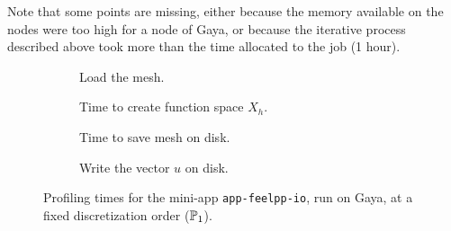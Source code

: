 Note that some points are missing, either because the memory available on the nodes were too high for a node of Gaya, or because the iterative process described above took more than the time allocated to the job (1 hour).



\begin{figure}
  \begin{subfigure}[c]{0.49\textwidth}
    \centering
    \plot{\dataLoadMesh}
    \caption{ Load the mesh. }
    \label{fig:specs:app-feelpp-io:loadmesh}
  \end{subfigure}
  \begin{subfigure}[c]{0.49\textwidth}
    \centering
    \plot{\dataFunctionSpace}
    \caption{ Time to create function space $X_h$. }
    \label{fig:specs:app-feelpp-io:functionspace}
  \end{subfigure}
  \begin{subfigure}[c]{0.49\textwidth}
    \centering
    \plot[(0.99,0.35)]{\dataSaveMesh}
    \caption{ Time to save mesh on disk. }
    \label{fig:specs:app-feelpp-io:savemesh}
  \end{subfigure}
  \begin{subfigure}[c]{0.49\textwidth}
    \centering
    \plot[(0.99,0.35)]{\dataExportData}
    \caption{ Write  the vector $u$ on disk. }
    \label{fig:specs:app-feelpp-io:export}
  \end{subfigure}
  \caption{Profiling times for the mini-app \texttt{app-feelpp-io}, run on Gaya, at a fixed discretization order ($\mathbb{P}_1$).}
  \label{fig:specs:app-feelpp-io}
\end{figure}

